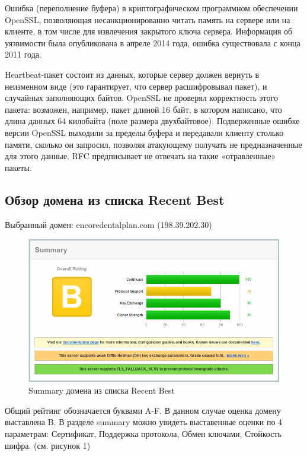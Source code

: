 \documentclass[11pt, a4paper]{article}		%
\begin{document}
\begin{itemize}
Ошибка (переполнение буфера) в криптографическом программном обеспечении OpenSSL, позволяющая несанкционированно читать память на сервере или на клиенте, в том числе для извлечения закрытого ключа сервера. Информация об уязвимости была опубликована в апреле 2014 года, ошибка существовала с конца 2011 года.

Heartbeat-пакет состоит из данных, которые сервер должен вернуть в неизменном виде (это гарантирует, что сервер расшифровывал пакет), и случайных заполняющих байтов. OpenSSL не проверял корректность этого пакета: возможен, например, пакет длиной 16 байт, в котором написано, что длина данных 64 килобайта (поле размера двухбайтовое). Подверженные ошибке версии OpenSSL выходили за пределы буфера и передавали клиенту столько памяти, сколько он запросил, позволяя атакующему получать не предназначенные для этого данные. RFC предписывает не отвечать на такие «отравленные» пакеты.

\end{itemize}



\subsection{Обзор домена из списка Recent Best}

Выбранный домен: encoredentalplan.com (198.39.202.30)

\begin{figure}[h!]
\centering
\includegraphics[scale=0.8]{res/summary_best_domain}
\caption{Summary домена из списка Recent Best}
\end{figure}

Общий рейтинг обозначается буквами A-F. В данном случае оценка домену выставлена B. В разделе summary можно увидеть выставенные оценки по 4 параметрам: Сертификат, Поддержка протокола, Обмен ключами, Стойкость шифра. (см. рисунок 1)
\end{document}
